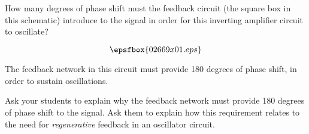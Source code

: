

How many degrees of phase shift must the feedback circuit (the square box in this schematic) introduce to the signal in order for this inverting amplifier circuit to oscillate?

$$\epsfbox{02669x01.eps}$$







The feedback network in this circuit must provide 180 degrees of phase shift, in order to sustain oscillations.  







Ask your students to explain why the feedback network must provide 180 degrees of phase shift to the signal.  Ask them to explain how this requirement relates to the need for {\it regenerative} feedback in an oscillator circuit.




